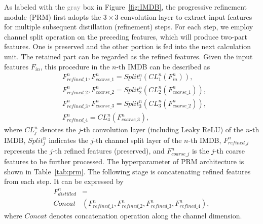 \documentclass[sigconf]{acmart}
\begin{document}
As labeled with the \textcolor{gray}{gray} box in Figure~\ref{fig:IMDB}, the progressive refinement module (PRM) first adopts the $3 \times 3$ convolution layer to extract input features for multiple subsequent distillation (refinement) steps. For each step, we employ channel split operation on the preceding features, which will produce two-part features. One is preserved and the other portion is fed into the next calculation unit. The retained part can be regarded as the refined features. Given the input features $F_{in}$, this procedure in the $n$-th IMDB can be described as
\begin{equation}
\begin{aligned}
&F_{refined\_1}^n,F_{coarse\_1}^n = Split_1^n\left( {CL_1^n\left( {F_{in}^n} \right)} \right), \\
&F_{refined\_2}^n,F_{coarse\_2}^n = Split_2^n\left( {CL_2^n\left( {F_{coarse\_1}^n} \right)} \right), \\
&F_{refined\_3}^n,F_{coarse\_3}^n = Split_3^n\left( {CL_3^n\left( {F_{coarse\_2}^n} \right)} \right), \\
&F_{refined\_4}^n = CL_4^n\left( {F_{coarse\_3}^n} \right),
\end{aligned} 
\end{equation}
where $CL_j^n$ denotes the $j$-th convolution layer (including Leaky ReLU) of the $n$-th IMDB, $Split_j^n$ indicates the $j$-th channel split layer of the $n$-th IMDB, $F_{refined\_j}^n$ represents the $j$-th refined features (preserved), and $F_{coarse\_j}^n$ is the $j$-th coarse features to be further processed. The hyperparameter of PRM architecture is shown in Table~\ref{tab:prm}. The following stage is concatenating refined features from each step. It can be expressed by
\begin{equation}
\begin{aligned}
F_{distilled}^n &= \\ Concat&\left( {F_{refined\_1}^n,F_{refined\_2}^n,F_{refined\_3}^n,F_{refined\_4}^n} \right),
\end{aligned}
\end{equation}
where $Concat$ denotes concatenation operation along the channel dimension.
\end{document}
